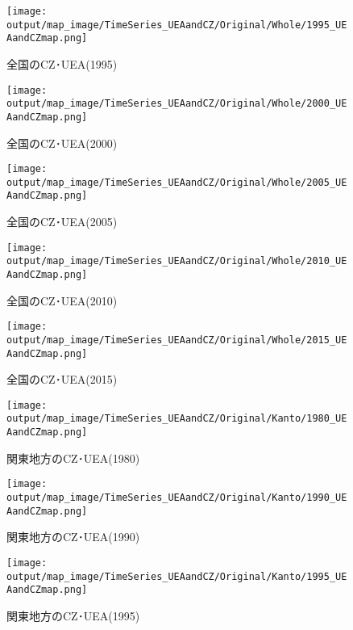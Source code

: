 \documentclass{ltjsarticle}
\begin{document}
  \begin{figure}[pbth]
    \centering
    \texttt{[image: output/map\_image/TimeSeries\_UEAandCZ/Original/Whole/1995\_UEAandCZmap.png]}
    \caption{\label{ori:tsA1995}全国のCZ･UEA(1995)}
  \end{figure}
  
  \begin{figure}[pbth]
    \centering
    \texttt{[image: output/map\_image/TimeSeries\_UEAandCZ/Original/Whole/2000\_UEAandCZmap.png]}
    \caption{\label{ori:tsA2000}全国のCZ･UEA(2000)}
  \end{figure}
  
  \begin{figure}[pbth]
    \centering
    \texttt{[image: output/map\_image/TimeSeries\_UEAandCZ/Original/Whole/2005\_UEAandCZmap.png]}
    \caption{\label{ori:tsA2005}全国のCZ･UEA(2005)}
  \end{figure}
  
  \begin{figure}[pbth]
    \centering
    \texttt{[image: output/map\_image/TimeSeries\_UEAandCZ/Original/Whole/2010\_UEAandCZmap.png]}
    \caption{\label{ori:tsA2010}全国のCZ･UEA(2010)}
  \end{figure}
  
  \begin{figure}[pbth]
    \centering
    \texttt{[image: output/map\_image/TimeSeries\_UEAandCZ/Original/Whole/2015\_UEAandCZmap.png]}
    \caption{\label{ori:tsA2015}全国のCZ･UEA(2015)}
  \end{figure}
  

\begin{figure}[pbth]
  \centering
  \texttt{[image: output/map\_image/TimeSeries\_UEAandCZ/Original/Kanto/1980\_UEAandCZmap.png]}
  \caption{\label{ori:tsK1980}関東地方のCZ･UEA(1980)}
\end{figure}

\begin{figure}[pbth]
  \centering
  \texttt{[image: output/map\_image/TimeSeries\_UEAandCZ/Original/Kanto/1990\_UEAandCZmap.png]}
  \caption{\label{ori:tsK1990}関東地方のCZ･UEA(1990)}
\end{figure}

\begin{figure}[pbth]
  \centering
  \texttt{[image: output/map\_image/TimeSeries\_UEAandCZ/Original/Kanto/1995\_UEAandCZmap.png]}
  \caption{\label{ori:tsK1995}関東地方のCZ･UEA(1995)}
\end{figure}
\end{document}
